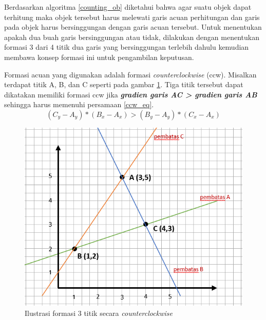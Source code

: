 \documentclass[conference]{IEEEtran}
\begin{document}
Berdasarkan algoritma \ref{counting_ob} diketahui bahwa agar suatu objek dapat terhitung maka objek tersebut harus melewati garis acuan perhitungan dan garis pada objek harus bersinggungan dengan garis acuan tersebut. 
Untuk menentukan apakah dua buah garis bersinggungan atau tidak, dilakukan dengan menentukan formasi 3 dari 4 titik dua garis yang bersinggungan terlebih dahulu kemudian membawa konsep formasi ini untuk pengambilan keputusan.

Formasi acuan yang digunakan adalah formasi \textit{counterclockwise} (ccw). Misalkan terdapat titik A, B, dan C seperti pada gambar \ref{ccw_img}. Tiga titik tersebut dapat dikatakan memiliki formasi ccw jika \textbf{\textit{gradien garis AC > gradien garis AB}}
sehingga harus memenuhi persamaan \ref{ccw_eq}.
\begin{equation} \label{ccw_eq}
	(C_y - A_y)*(B_x - A_x) > (B_y - A_y)*(C_x - A_x)
\end{equation}

\begin{figure}[htp]
	\centering
	\includegraphics[scale=0.5]{CCW}
	\caption{Ilustrasi formasi 3 titik secara \textit{counterclockwise}}
	\label{ccw_img}
\end{figure}
\end{document}
